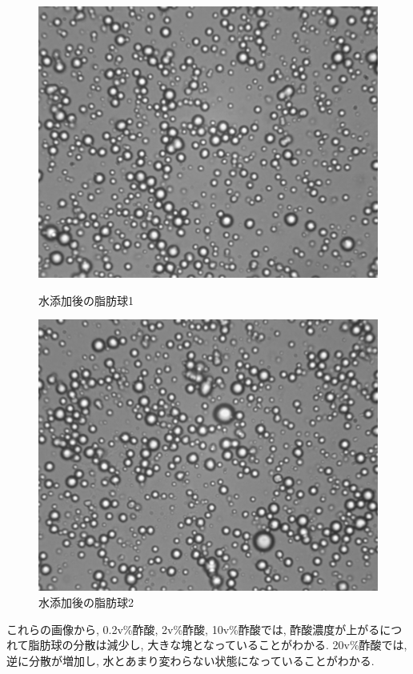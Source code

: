 \documentclass[11pt]{ltjsarticle}
\begin{document}
      \begin{figure}[H]
        \centering
        \begin{minipage}{0.48\textwidth}
          \centering
          \includegraphics[width=\linewidth]{mizumoto_mizu1.png}
          \caption{水添加後の脂肪球1}
          \label{fig:aqua_1}
        \end{minipage}
        \hfill
        \begin{minipage}{0.48\textwidth}
          \centering
          \includegraphics[width=\linewidth]{mizumoto_mizu2.png}
          \caption{水添加後の脂肪球2}
          \label{fig:aqua_2}
        \end{minipage}
      \end{figure}
      これらの画像から, 0.2v\%酢酸, 2v\%酢酸, 10v\%酢酸では, 酢酸濃度が上がるにつれて脂肪球の分散は減少し, 大きな塊となっていることがわかる. 20v\%酢酸では, 逆に分散が増加し, 水とあまり変わらない状態になっていることがわかる.
\end{document}
